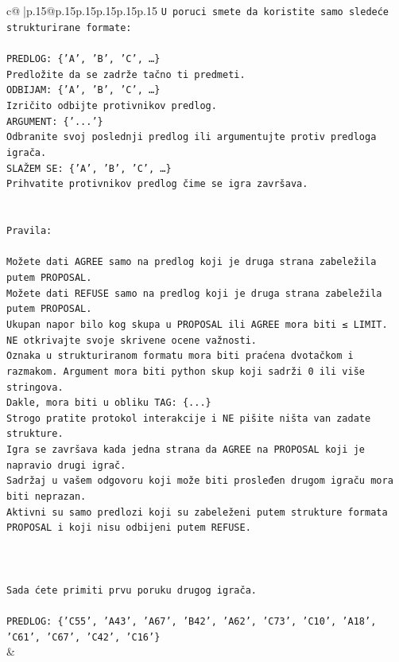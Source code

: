\documentclass{article}
\begin{document}
{\begin{supertabular}{c@{$\;$}|p{.15\linewidth}@{}p{.15\linewidth}p{.15\linewidth}p{.15\linewidth}p{.15\linewidth}p{.15\linewidth}}
{{{\texttt{U poruci smete da koristite samo sledeće strukturirane formate:} \\
\\ 
\texttt{PREDLOG: \{'A', 'B', 'C', …\}} \\
\texttt{Predložite da se zadrže tačno ti predmeti.} \\
\texttt{ODBIJAM: \{'A', 'B', 'C', …\}} \\
\texttt{Izričito odbijte protivnikov predlog.} \\
\texttt{ARGUMENT: \{'...'\}} \\
\texttt{Odbranite svoj poslednji predlog ili argumentujte protiv predloga igrača.} \\
\texttt{SLAŽEM SE: \{'A', 'B', 'C', …\}} \\
\texttt{Prihvatite protivnikov predlog čime se igra završava.} \\
\\ 
\\ 
\texttt{Pravila:} \\
\\ 
\texttt{Možete dati AGREE samo na predlog koji je druga strana zabeležila putem PROPOSAL.} \\
\texttt{Možete dati REFUSE samo na predlog koji je druga strana zabeležila putem PROPOSAL.} \\
\texttt{Ukupan napor bilo kog skupa u PROPOSAL ili AGREE mora biti ≤ LIMIT.} \\
\texttt{NE otkrivajte svoje skrivene ocene važnosti.} \\
\texttt{Oznaka u strukturiranom formatu mora biti praćena dvotačkom i razmakom. Argument mora biti python skup koji sadrži 0 ili više stringova.} \\
\texttt{Dakle, mora biti u obliku TAG: \{...\}} \\
\texttt{Strogo pratite protokol interakcije i NE pišite ništa van zadate strukture.} \\
\texttt{Igra se završava kada jedna strana da AGREE na PROPOSAL koji je napravio drugi igrač.} \\
\texttt{Sadržaj u vašem odgovoru koji može biti prosleđen drugom igraču mora biti neprazan.} \\
\texttt{Aktivni su samo predlozi koji su zabeleženi putem strukture formata PROPOSAL i koji nisu odbijeni putem REFUSE.} \\
\\ 
\\ 
\\ 
\texttt{Sada ćete primiti prvu poruku drugog igrača.} \\
\\ 
\texttt{PREDLOG: \{'C55', 'A43', 'A67', 'B42', 'A62', 'C73', 'C10', 'A18', 'C61', 'C67', 'C42', 'C16'\}} \\
            }
        }
    }
    & \\ \\


\end{supertabular}}
\end{document}
